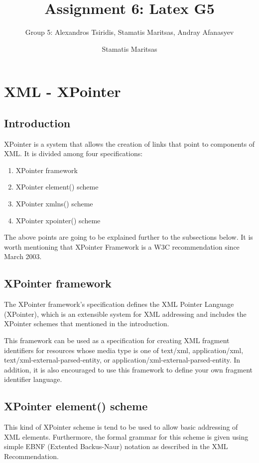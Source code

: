 \documentclass[11pt]{article}
\title{Assignment 6: Latex G5}
\author{Group 5: Alexandros Tsiridis, Stamatis Maritsas, Andray Afanasyev}
\date{}
\begin{document}
\maketitle
\tableofcontents
\listoffigures
\listoftables

\section{XML - XPointer}
\author{Stamatis Maritsas}
\subsection{Introduction}
XPointer is a system that allows the creation of links that point to components of XML. It is divided among four specifications:
\begin{enumerate}
\item XPointer framework
\item XPointer element() scheme
\item XPointer xmlns() scheme
\item XPointer xpointer() scheme
\end{enumerate}
The above points are going to be explained further to the subsections below. It is worth mentioning that XPointer Framework is a W3C recommendation since March 2003.

\subsection{XPointer framework}

The XPointer framework's specification defines the XML Pointer Language (XPointer), which is an extensible system for XML addressing and includes the XPointer schemes that mentioned in the introduction.

This framework can be used as a specification for creating XML fragment identifiers for resources whose media type is one of text/xml, application/xml, text/xml-external-parsed-entity, or application/xml-external-parsed-entity. In addition, it is also encouraged to use this framework to define your own fragment identifier language. \cite{xpointerframework}

\subsection{XPointer element() scheme}

This kind of XPointer scheme is tend to be used to allow basic addressing of XML elements. Furthermore, the formal grammar for this scheme is given using simple EBNF (Extented Backus-Naur) notation as described in the XML Recommendation.\cite{elementscheme}
\end{document}
